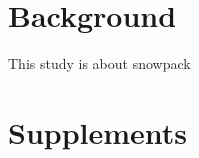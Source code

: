 
\section{Background}

This study is about snowpack




\section{Supplements}
\setcounter{table}{0}
\renewcommand{\thetable}{S\arabic{table}}
\setcounter{figure}{0}
\renewcommand{\thefigure}{S\arabic{figure}}

